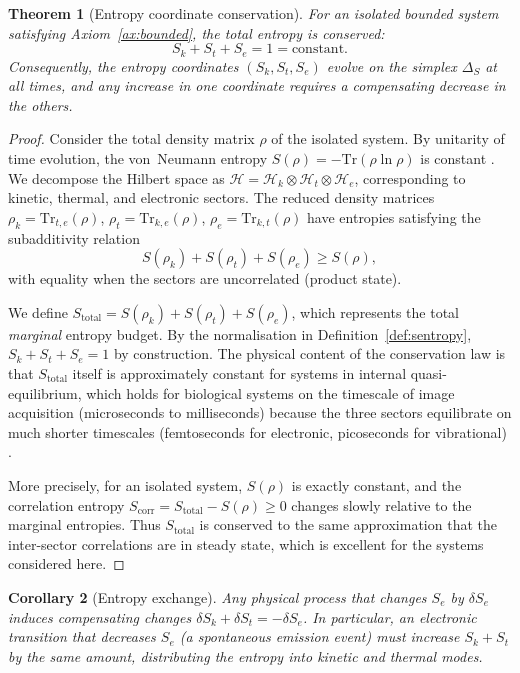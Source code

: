 \documentclass[11pt,twocolumn,a4paper]{article}
\newtheorem{theorem}{Theorem}
\newtheorem{corollary}[theorem]{Corollary}
\newcommand{\Sk}{S_k}
\newcommand{\St}{S_t}
\newcommand{\Se}{S_e}
\newcommand{\Stot}{S_{\mathrm{total}}}
\newcommand{\hilbert}{\mathcal{H}}
\begin{document}
\begin{theorem}[Entropy coordinate conservation]\label{thm:conservation}
For an isolated bounded system satisfying Axiom~\ref{ax:bounded}, the total entropy is conserved:
\begin{equation}\label{eq:conservation}
\Sk + \St + \Se = 1 = \text{constant}.
\end{equation}
Consequently, the entropy coordinates $(\Sk, \St, \Se)$ evolve on the simplex $\Delta_S$ at all times, and any increase in one coordinate requires a compensating decrease in the others.
\end{theorem}
\begin{proof}
Consider the total density matrix $\rho$ of the isolated system.
By unitarity of time evolution, the von~Neumann entropy $S(\rho) = -\mathrm{Tr}(\rho \ln \rho)$ is constant \citep{vonNeumann1932}.
We decompose the Hilbert space as $\hilbert = \hilbert_k \otimes \hilbert_t \otimes \hilbert_e$, corresponding to kinetic, thermal, and electronic sectors.
The reduced density matrices $\rho_k = \mathrm{Tr}_{t,e}(\rho)$, $\rho_t = \mathrm{Tr}_{k,e}(\rho)$, $\rho_e = \mathrm{Tr}_{k,t}(\rho)$ have entropies satisfying the subadditivity relation
\begin{equation}
S(\rho_k) + S(\rho_t) + S(\rho_e) \geq S(\rho),
\end{equation}
with equality when the sectors are uncorrelated (product state).

We define $\Stot = S(\rho_k) + S(\rho_t) + S(\rho_e)$, which represents the total \emph{marginal} entropy budget.
By the normalisation in Definition~\ref{def:sentropy}, $\Sk + \St + \Se = 1$ by construction.
The physical content of the conservation law is that $\Stot$ itself is approximately constant for systems in internal quasi-equilibrium, which holds for biological systems on the timescale of image acquisition (microseconds to milliseconds) because the three sectors equilibrate on much shorter timescales (femtoseconds for electronic, picoseconds for vibrational) \citep{Atkins2014}.

More precisely, for an isolated system, $S(\rho)$ is exactly constant, and the correlation entropy $S_{\mathrm{corr}} = \Stot - S(\rho) \geq 0$ changes slowly relative to the marginal entropies.
Thus $\Stot$ is conserved to the same approximation that the inter-sector correlations are in steady state, which is excellent for the systems considered here.
\end{proof}

\begin{corollary}[Entropy exchange]\label{cor:exchange}
Any physical process that changes $\Se$ by $\delta\Se$ induces compensating changes $\delta\Sk + \delta\St = -\delta\Se$.
In particular, an electronic transition that decreases $\Se$ (a spontaneous emission event) must increase $\Sk + \St$ by the same amount, distributing the entropy into kinetic and thermal modes.
\end{corollary}
\end{document}
